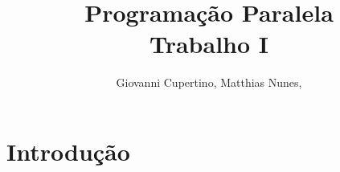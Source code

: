 \documentclass[9pt]{IEEEtran}
\title{Programação Paralela\\ Trabalho I}
\author{Giovanni Cupertino, Matthias Nunes, \IEEEmembership{Usuário pp12820}}
\begin{document}
\maketitle

\section{Introdução}
\end{document}
